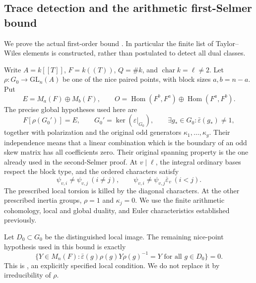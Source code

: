 \subsection{Trace detection and the arithmetic first-Selmer bound}
\label{sec:arithmetic-first-selmer}

We prove the actual first-order bound .
In particular the finite list of Taylor--Wiles elements is
constructed, rather than postulated to detect all dual classes.

Write \(A=k[[T]]\), \(F=k((T))\), \(Q=\#k\), and
\(\operatorname{char}k=\ell\ne2\).
Let \(\rho:G_0\to\mathrm{GL}_n(A)\) be one of the nice paired
points, with block sizes \(a,b=n-a\).
Put
\[
 E=M_a(F)\oplus M_b(F),\qquad
 O=\operatorname{Hom}(F^b,F^a)\oplus
                         \operatorname{Hom}(F^a,F^b).
\]
The precise global hypotheses used here are
\[
 F[\rho(G_0')]=E,\qquad
 G_0'=\ker(\varepsilon|_{G_0}),\qquad
 \exists g_*\in G_0:\bar\varepsilon(g_*)\ne1,
 \tag{B1a}
\]
together with polarization and the original odd generators
\(\kappa_1,\ldots,\kappa_g\).
Their independence means that a linear combination which is
the boundary of an odd skew matrix has all coefficients zero.
Their original spanning property is the one already used in
the second-Selmer proof.
At \(v\mid\ell\), the integral ordinary bases respect the block
type, and the ordered characters satisfy
\[
 \psi_{v,i}\ne\psi_{v,j}\ (i\ne j),\qquad
 \psi_{v,i}\ne\psi_{v,j}\bar\varepsilon_v\ (i<j).
 \tag{B1b}
\]
The prescribed local torsion is killed by the diagonal
characters.  At the other prescribed inertia groups,
\(\rho=1\) and \(\kappa_j=0\).
We use the finite arithmetic cohomology, local and global duality,
and Euler characteristics established previously.

Let \(D_0\subset G_0\) be the distinguished local image.
The remaining nice-point hypothesis used in this bound is exactly
\[
 \{Y\in M_n(F):
    \bar\varepsilon(g)\rho(g)Y\rho(g)^{-1}=Y
                         \text{ for all }g\in D_0\}=0 .
 \tag{B1c}
\]
This is , an explicitly specified local condition.
We do not replace it by irreducibility of \(\rho\).

